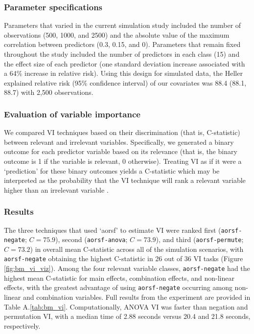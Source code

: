 \documentclass[twoside,11pt]{article}\usepackage[]{graphicx}\usepackage[]{xcolor}
\newcommand{\ie}{that is}
\newcommand{\tabrefAppendix}[1]{Table A.\ref{#1}}
\begin{document}
\subsubsection{Parameter specifications}




Parameters that varied in the current simulation study included the number of observations (500, 1000, and 2500) and the absolute value of the maximum correlation between predictors (0.3, 0.15, and 0). Parameters that remain fixed throughout the study included the number of predictors in each class (15) and the effect size of each predictor (one standard deviation increase associated with a 64\% increase in relative risk). Using this design for simulated data, the Heller explained relative risk (95\% confidence interval) of our covariates was 88.4 (88.1, 88.7) \citep{heller2012measure} with 2,500 observations.

\subsubsection{Evaluation of variable importance}

We compared VI techniques based on their discrimination (\ie, C-statistic) between relevant and irrelevant variables. Specifically, we generated a binary outcome for each predictor variable based on its relevance (\ie, the binary outcome is 1 if the variable is relevant, 0 otherwise). Treating VI as if it were a ‘prediction’ for these binary outcomes yields a C-statistic which may be interpreted as the probability that the VI technique will rank a relevant variable higher than an irrelevant variable \citep{harrell1982evaluating}.

\subsubsection{Results} \label{sec:results_vi}



The three techniques that used `aorsf' to estimate VI were ranked first (\texttt{aorsf-negate}; $C = 75.9$), second (\texttt{aorsf-anova}; $C = 73.9$), and third (\texttt{aorsf-permute}; $C = 73.2$) in overall mean C-statistic across all of the simulation scenarios, with \texttt{aorsf-negate} obtaining the highest C-statistic in 26 out of 36 VI tasks (Figure \ref{fig:bm_vi_viz}). Among the four relevant variable classes, \texttt{aorsf-negate} had the highest mean C-statistic for main effects, combination effects, and non-linear effects, with the greatest advantage of using \texttt{aorsf-negate} occurring among non-linear and combination variables. Full results from the experiment are provided in \tabrefAppendix{tab:bm_vi}. Computationally, ANOVA VI was faster than negation and permutation VI, with a median time of 2.88 seconds versus 20.4 and 21.8 seconds, respectively.
\end{document}
